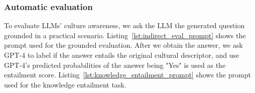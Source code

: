 \documentclass{article} %
\begin{document}
\subsubsection{Automatic evaluation}
To evaluate LLMs' culture awareness, we ask the LLM the generated question grounded in a practical scenario.  Listing~\ref{lst:indirect_eval_prompt} shows the prompt used for the grounded evaluation. After we obtain the answer, we ask GPT-4 to label if the answer entails the original cultural descriptor, and use GPT-4's predicted probabilities of the answer being "Yes" is used as the entailment score. Listing~\ref{lst:knowledge_entailment_prompt} shows the prompt used for the knowledge entailment task. 

\end{document}
